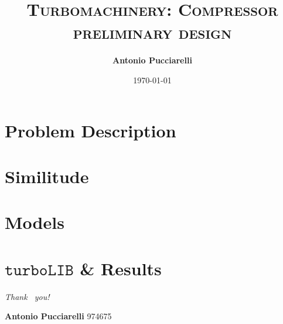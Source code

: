 \documentclass{beamer}
\author{\textbf{Antonio Pucciarelli}}
\title{\textsc{Turbomachinery: Compressor preliminary design}}
\institute{Politecnico di Milano}
\date{\today}
\begin{document}
	\begin{frame}
    		\titlepage
    	\end{frame}

	\section{Problem Description}
        
        
	\section{Similitude}
        
    
   	\section{Models}
        
	
	\section{$\mathtt{turboLIB}$ \& Results}
	

	    
	\begin{frame}[allowframebreaks]
		\printbibliography
	\end{frame}
	\begin{frame}
		\begin{center}
			{\Huge \emph {\textrm{Thank  ~you!}}}
		\end{center}
		
		\vspace{2cm}
		
		\Large{\textbf{Antonio Pucciarelli}        \hfill 974675} \\ 
        
	\end{frame}
\end{document}
